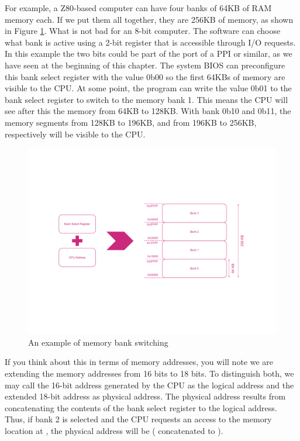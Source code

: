 For example, a Z80-based computer can have four banks of 64KB of RAM memory each. If we put them all together, they are 256KB of memory, as shown in Figure \ref{fig:msx-mem-banks}. What is not bad for an 8-bit computer. The software can choose what bank is active using a 2-bit register that is accessible through I/O requests. In this example the two bits could be part of the port of a PPI or similar, as we have seen at the beginning of this chapter. The system BIOS can preconfigure this bank select register with the value 0b00 so the first 64KBs of memory are visible to the CPU. At some point, the program can write the value 0b01 to the bank select register to switch to the memory bank 1. This means the CPU will see after this the memory from 64KB to 128KB. With bank 0b10 and 0b11, the memory segments from 128KB to 196KB, and from 196KB to 256KB, respectively will be visible to the CPU. 

\begin{figure}
	\centering
	\includegraphics[width=1\linewidth,trim={0cm 150 0 100}]{images/figures/msx-mem-banks}
	\caption{An example of memory bank switching}
	\label{fig:msx-mem-banks}
\end{figure}

If you think about this in terms of memory addresses, you will note we are extending the memory addresses from 16 bits to 18 bits. To distinguish both, we may call the 16-bit address generated by the CPU as the logical address and the extended 18-bit address as physical address. The physical address results from concatenating the contents of the bank select register to the logical address. Thus, if bank 2 is selected and the CPU requests an access to the memory location at , the physical address will be  ( concatenated to ). 

